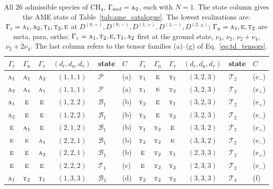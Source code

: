 \documentclass[
  reprint,
  aps,
  prx,
  superscriptaddress,
  amsmath,
  amssymb,
  longbibliography
]{revtex4-2}
\newcommand{\irr}[1]{\text{\normalfont\scshape #1}}
\newcommand{\irrJp}[2]{D^{(#1,#2)}}
\providecommand{\Gmol}{\Gamma_{\mathrm{mol}}}
\providecommand{\Grot}{\Gamma_{\mathrm{r}}}
\providecommand{\Gvib}{\Gamma_{\mathrm{v}}}
\providecommand{\Gspin}{\Gamma_{\mathrm{n}}}
\newcommand{\catP}{\mathcal{P}}
\newcommand{\catB}[1]{\mathcal{B}_{#1}}
\newcommand{\catT}[1]{\mathcal{T}_{#1}}
\begin{document}
\begin{table}[t]
\caption{All $26$ admissible species of $\mathrm{CH_4}$, $\Gmol=\irr{a}_{2}$, each with $N=1$. The state column gives the AME state of Table~\ref{tab:ame_catalogue}. The lowest realizations are: $\Grot=\irr{a}_{1},\irr{a}_{2},\irr{t}_{1},\irr{t}_{2},\irr{e}$ at $\irrJp{0}{+},\irrJp{0}{-},\irrJp{1}{+},\irrJp{1}{-},\irrJp{2}{\pm}$; $\Gspin=\irr{a}_{1},\irr{e},\irr{t}_{2}$ are meta, para, ortho; $\Gvib=\irr{a}_{1},\irr{t}_{2},\irr{e},\irr{t}_{1},\irr{a}_{2}$ first at the ground state, $\nu_4$, $\nu_2$, $\nu_2{+}\nu_4$, $\nu_2{+}2\nu_4$. The last column refers to the tensor families (a)--(g) of Eq.~\eqref{eq:td_tensors}.}
\label{tab:methane_species}
\centering
\small
\begin{tabular}{ccccll@{\qquad}ccccll}
\toprule
$\Grot$ & $\Gspin$ & $\Gvib$ & $(d_{\mathrm{r}},d_{\mathrm{n}},d_{\mathrm{v}})$ & state & $C$ &
$\Grot$ & $\Gspin$ & $\Gvib$ & $(d_{\mathrm{r}},d_{\mathrm{n}},d_{\mathrm{v}})$ & state & $C$\\
\midrule
$\irr{a}_{1}$ & $\irr{a}_{1}$ & $\irr{a}_{2}$ & $(1,1,1)$ & $\catP$ & (a) & $\irr{t}_{1}$ & $\irr{e}$ & $\irr{t}_{1}$ & $(3,2,3)$ & $\catT{2}$ & (e$_-$)\\
$\irr{a}_{2}$ & $\irr{a}_{1}$ & $\irr{a}_{1}$ & $(1,1,1)$ & $\catP$ & (a) & $\irr{t}_{1}$ & $\irr{e}$ & $\irr{t}_{2}$ & $(3,2,3)$ & $\catT{2}$ & (e$_+$)\\
$\irr{a}_{1}$ & $\irr{e}$ & $\irr{e}$ & $(1,2,2)$ & $\catB{1}$ & (b) & $\irr{t}_{2}$ & $\irr{e}$ & $\irr{t}_{1}$ & $(3,2,3)$ & $\catT{2}$ & (e$_+$)\\
$\irr{a}_{2}$ & $\irr{e}$ & $\irr{e}$ & $(1,2,2)$ & $\catB{1}$ & (b) & $\irr{t}_{2}$ & $\irr{e}$ & $\irr{t}_{2}$ & $(3,2,3)$ & $\catT{2}$ & (e$_-$)\\
$\irr{e}$ & $\irr{a}_{1}$ & $\irr{e}$ & $(2,1,2)$ & $\catB{1}$ & (b) & $\irr{t}_{1}$ & $\irr{t}_{2}$ & $\irr{e}$ & $(3,3,2)$ & $\catT{2}$ & (e$_+$)\\
$\irr{e}$ & $\irr{e}$ & $\irr{a}_{1}$ & $(2,2,1)$ & $\catB{1}$ & (b) & $\irr{t}_{2}$ & $\irr{t}_{2}$ & $\irr{e}$ & $(3,3,2)$ & $\catT{2}$ & (e$_-$)\\
$\irr{e}$ & $\irr{e}$ & $\irr{a}_{2}$ & $(2,2,1)$ & $\catB{1}$ & (b) & $\irr{e}$ & $\irr{t}_{2}$ & $\irr{t}_{1}$ & $(2,3,3)$ & $\catT{2}$ & (e$_+$)\\
$\irr{e}$ & $\irr{e}$ & $\irr{e}$ & $(2,2,2)$ & $\catT{1}$ & (c) & $\irr{e}$ & $\irr{t}_{2}$ & $\irr{t}_{2}$ & $(2,3,3)$ & $\catT{2}$ & (e$_-$)\\
$\irr{a}_{1}$ & $\irr{t}_{2}$ & $\irr{t}_{1}$ & $(1,3,3)$ & $\catB{2}$ & (d) & $\irr{t}_{2}$ & $\irr{t}_{2}$ & $\irr{t}_{2}$ & $(3,3,3)$ & $\catT{3}$ & (f)\\

\end{tabular}
\end{table}
\end{document}

